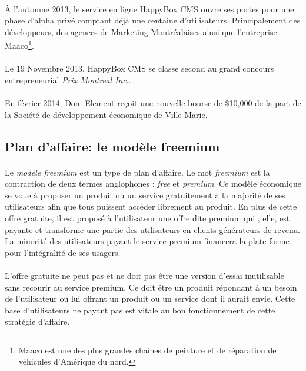 \documentclass[11pt, a4paper ]{article}
\begin{document}
\begin{spacing}{1.5}
\paragraph{}
À l'automne 2013, le service en ligne HappyBox CMS ouvre ses portes pour une phase d'alpha privé comptant déjà une centaine d'utilisateurs. Principalement des développeurs, des agences de Marketing Montréalaises ainsi que l'entreprise Maaco\footnote{Maaco est une des plus grandes chaînes de peinture et de réparation de véhicules d'Amérique du nord.}.

\paragraph{}
Le 19 Novembre 2013, HappyBox CMS se classe second au grand concours entrepreneurial \emph{Prix Montreal Inc}..

\paragraph{}
En février 2014, Dom Element reçoit une nouvelle bourse de \$10,000 de la part de la Société de développement économique de Ville-Marie.

			\subsection{Plan d'affaire: le modèle freemium} %

\paragraph{}
Le \emph{modèle freemium} est un type de plan d'affaire. Le mot \emph{freemium} est la contraction de deux termes anglophones : \emph{free} et \emph{premium}. Ce modèle économique se voue à proposer un produit ou un service gratuitement à la majorité de ses utilisateurs afin que tous puissent accéder librement au produit. En plus de cette offre gratuite, il est proposé à l'utilisateur une offre dite premium qui , elle, est payante et transforme une partie des utilisateurs en clients générateurs de revenu. La minorité des utilisateurs payant le service premium financera la plate-forme pour l'intégralité de ses usagers.


\paragraph{} %
L'offre gratuite ne peut pas et ne doit pas être une version d'essai inutilisable sans recourir au service premium. Ce doit être un produit répondant à un besoin de l'utilisateur ou lui offrant un produit ou un service dont il aurait envie. Cette base d'utilisateurs ne payant pas est vitale au bon fonctionnement de cette stratégie d'affaire.


\end{spacing}
\end{document}
